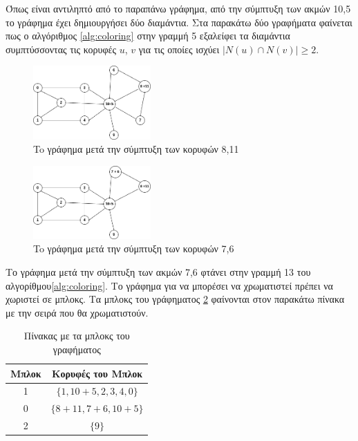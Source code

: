 Όπως είναι αντιληπτό από το παραπάνω γράφημα, από την σύμπτυξη των ακμών 10,5 το γράφημα έχει δημιουργήσει δύο διαμάντια. Στα παρακάτω δύο γραφήματα φαίνεται πως ο αλγόριθμος \ref{alg:coloring} στην γραμμή 5 εξαλείφει τα διαμάντια συμπτύσσοντας τις κορυφές $u$, $v$ για τις οποίες ισχύει $|N(u) \cap N(v)| \geq 2$.

\begin{figure}[H]
	\centering
	\includegraphics[width=0.4\textwidth]{pictures/ex-coloring-3.png} 
	\caption{To γράφημα μετά την σύμπτυξη των κορυφών 8,11}
	\label{fig:ex-coloring-3}
\end{figure}

\begin{figure}[H]
	\centering
	\includegraphics[width=0.4\textwidth]{pictures/ex-coloring-4.png} 
	\caption{To γράφημα μετά την σύμπτυξη των κορυφών 7,6}
	\label{fig:ex-coloring-4}
\end{figure}

Το γράφημα μετά την σύμπτυξη των ακμών 7,6 φτάνει στην γραμμή 13 του αλγορίθμου\ref{alg:coloring}. Το γράφημα για να μπορέσει να χρωματιστεί πρέπει να χωριστεί σε μπλοκς. Τα μπλοκς του γράφηματος \ref{fig:ex-coloring-4} φαίνονται στον παρακάτω πίνακα με την σειρά που θα χρωματιστούν. 

\begin{table}[H]
	\centering
	\begin{tabular}{|c|c|}
		\hline
		Μπλοκ & Κορυφές του Μπλοκ \\
		\hline
		1 & $\{1, 10+5, 2, 3, 4, 0 \}$ \\
		0 & $\{8+11, 7+6, 10+5 \}$ \\
		2 & $\{9 \}$ \\
		\hline
	\end{tabular}
	\caption{Πίνακας με τα μπλοκς του γραφήματος}
	\label{tab:blocks}
\end{table}

